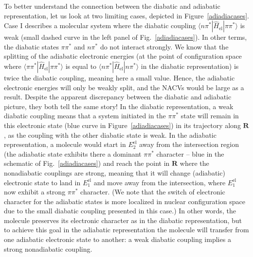 \documentclass[9pt,bestpractices,pubversion]{livecoms}
\begin{document}
To better understand the connection between the diabatic and adiabatic representation, let us look at two limiting cases, depicted in Figure~\ref{adiadiacases}. Case I describes a molecular system where the diabatic coupling $\langle n\pi^\ast | \hat{H}_{\text{el}} | \pi\pi^\ast\rangle$ is weak (small dashed curve in the left panel of Fig.~\ref{adiadiacases}). In other terms, the diabatic states $\pi\pi^\ast$ and $n\pi^\ast$ do not interact strongly. We know that the splitting of the adiabatic electronic energies (at the point of configuration space where $\langle \pi\pi^\ast | \hat{H}_{\text{el}} | \pi\pi^\ast\rangle$ is equal to $\langle n\pi^\ast | \hat{H}_{\text{el}} | n\pi^\ast\rangle$ in the diabatic representation) is twice the diabatic coupling, meaning here a small value. Hence, the adiabatic electronic energies will only be weakly split, and the NACVs would be large as a result. Despite the apparent discrepancy between the diabatic and adiabatic picture, they both tell the same story! In the diabatic representation, a weak diabatic coupling means that a system initiated in the $\pi\pi^\ast$ state will remain in this electronic state (blue curve in Figure~\ref{adiadiacases}) in its trajectory along $\mathbf{R}$, as the coupling with the other diabatic state is weak. In the adiabatic representation, a molecule would start in $E_2^{\text{el}}$ away from the intersection region (the adiabatic state exhibits there a dominant $\pi\pi^\ast$ character -- blue in the schematic of Fig.~\ref{adiadiacases}) and reach the point in $\mathbf{R}$ where the nonadiabatic couplings are strong, meaning that it will change (adiabatic) electronic state to land in $E_1^{\text{el}}$ and move away from the intersection, where $E_1^{\text{el}}$ now exhibit a strong $\pi\pi^\ast$ character. (We note that the switch of electronic character for the adiabatic states is more localized in nuclear configuration space due to the small diabatic coupling presented in this case.)  In other words, the molecule preserves its electronic character as in the diabatic representation, but to achieve this goal in the adiabatic representation the molecule will transfer from one adiabatic electronic state to another: a weak diabatic coupling implies a strong nonadiabatic coupling.
\end{document}
